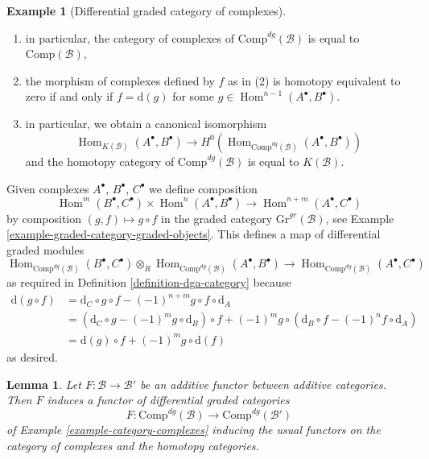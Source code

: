 \documentclass{stacks-project}
\theoremstyle{plain}
\newtheorem{lemma}[subsection]{Lemma}
\theoremstyle{definition}
\newtheorem{example}[subsection]{Example}
\theoremstyle{remark}
\numberwithin{equation}{subsection}
\def\Hom{\mathop{\mathrm{Hom}}\nolimits}
\begin{document}
\begin{example}[Differential graded category of complexes]
\begin{enumerate}
is actually a map of complexes,
\item in particular, the category of complexes of
$\text{Comp}^{dg}(\mathcal{B})$ is equal to $\text{Comp}(\mathcal{B})$,
\item the morphism of complexes defined by $f$ as in (2)
is homotopy equivalent to zero if and only if $f = \text{d}(g)$
for some $g \in \Hom^{n - 1}(A^\bullet, B^\bullet)$.
\item in particular, we obtain a canonical isomorphism
$$
\Hom_{K(\mathcal{B})}(A^\bullet, B^\bullet)
\longrightarrow
H^0(\Hom_{\text{Comp}^{dg}(\mathcal{B})}(A^\bullet, B^\bullet))
$$
and the homotopy category of $\text{Comp}^{dg}(\mathcal{B})$ is equal to
$K(\mathcal{B})$.
\end{enumerate}
Given complexes $A^\bullet$, $B^\bullet$, $C^\bullet$ we define
composition
$$
\Hom^m(B^\bullet, C^\bullet) \times \Hom^n(A^\bullet, B^\bullet)
\longrightarrow
\Hom^{n + m}(A^\bullet, C^\bullet)
$$
by composition $(g, f) \mapsto g \circ f$ in the graded category
$\text{Gr}^{gr}(\mathcal{B})$, see
Example \ref{example-graded-category-graded-objects}.
This defines a map of differential graded modules
$$
\Hom_{\text{Comp}^{dg}(\mathcal{B})}(B^\bullet, C^\bullet)
\otimes_R
\Hom_{\text{Comp}^{dg}(\mathcal{B})}(A^\bullet, B^\bullet)
\longrightarrow
\Hom_{\text{Comp}^{dg}(\mathcal{B})}(A^\bullet, C^\bullet)
$$
as required in Definition \ref{definition-dga-category}
because
\begin{align*}
\text{d}(g \circ f) & =
\text{d}_C \circ g \circ f - (-1)^{n + m} g \circ f \circ \text{d}_A \\
& =
\left(\text{d}_C \circ g - (-1)^m g \circ \text{d}_B\right) \circ f +
(-1)^m g \circ \left(\text{d}_B \circ f - (-1)^n f \circ \text{d}_A\right) \\
& =
\text{d}(g) \circ f + (-1)^m g \circ \text{d}(f)
\end{align*}
as desired.
\end{example}

\begin{lemma}
\label{lemma-additive-functor-induces-dga-functor}
Let $F : \mathcal{B} \to \mathcal{B}'$ be an additive functor between
additive categories. Then $F$ induces a functor of differential
graded categories
$$
F : \text{Comp}^{dg}(\mathcal{B}) \to \text{Comp}^{dg}(\mathcal{B}')
$$
of Example \ref{example-category-complexes}
inducing the usual functors on the category of complexes and the
homotopy categories.
\end{lemma}
\end{document}
